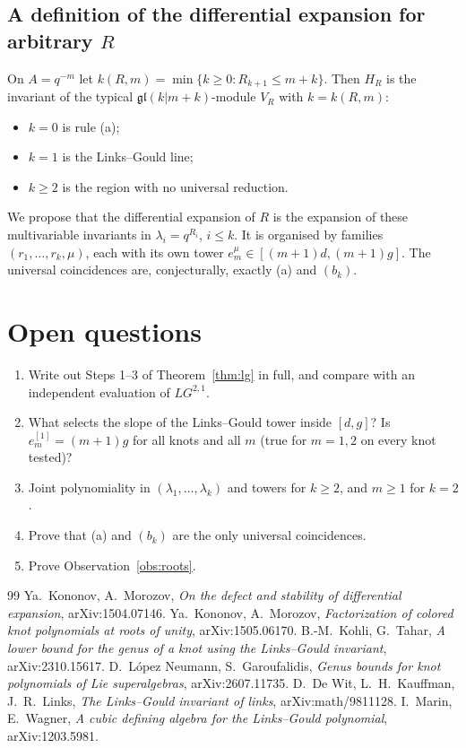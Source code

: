\documentclass[11pt]{article}
\theoremstyle{definition}
\theoremstyle{remark}
\newcommand{\gl}{\mathfrak{gl}}
\begin{document}
\subsection{A definition of the differential expansion for arbitrary $R$}
On $A=q^{-m}$ let $k(R,m)=\min\{k\ge0:R_{k+1}\le m+k\}$.  Then $H_R$ is the invariant of the typical
$\gl(k|m+k)$-module $V_R$ with $k=k(R,m)$:
\begin{itemize}
\item $k=0$ is rule (a);
\item $k=1$ is the Links--Gould line;
\item $k\ge2$ is the region with no universal reduction.
\end{itemize}
We propose that the differential expansion of $R$ is the expansion of these multivariable invariants in
$\lambda_i=q^{R_i}$, $i\le k$.  It is organised by families $(r_1,\dots,r_k,\mu)$, each with its own tower
$e^\mu_m\in[(m+1)d,(m+1)g]$.  The universal coincidences are, conjecturally, exactly (a) and $(b_k)$.

\section{Open questions}
\begin{enumerate}
\item Write out Steps 1--3 of Theorem~\ref{thm:lg} in full, and compare with an independent evaluation of
$LG^{2,1}$.
\item What selects the slope of the Links--Gould tower inside $[d,g]$?  Is $e^{[1]}_m=(m+1)g$ for all knots and
all $m$ (true for $m=1,2$ on every knot tested)?
\item Joint polynomiality in $(\lambda_1,\dots,\lambda_k)$ and towers for $k\ge2$, and $m\ge1$ for $k=2$.
\item Prove that (a) and $(b_k)$ are the only universal coincidences.
\item Prove Observation~\ref{obs:roots}.
\end{enumerate}

\begin{thebibliography}{99}
 Ya.~Kononov, A.~Morozov, \emph{On the defect and stability of differential expansion},
arXiv:1504.07146.
 Ya.~Kononov, A.~Morozov, \emph{Factorization of colored knot polynomials at roots of unity},
arXiv:1505.06170.
 B.-M.~Kohli, G.~Tahar, \emph{A lower bound for the genus of a knot using the Links--Gould invariant},
arXiv:2310.15617.
 D.~L\'opez Neumann, S.~Garoufalidis, \emph{Genus bounds for knot polynomials of Lie superalgebras},
arXiv:2607.11735.
 D.~De Wit, L.~H.~Kauffman, J.~R.~Links, \emph{The Links--Gould invariant of links},
arXiv:math/9811128.
 I.~Marin, E.~Wagner, \emph{A cubic defining algebra for the Links--Gould polynomial},
arXiv:1203.5981.
\end{thebibliography}
\end{document}
